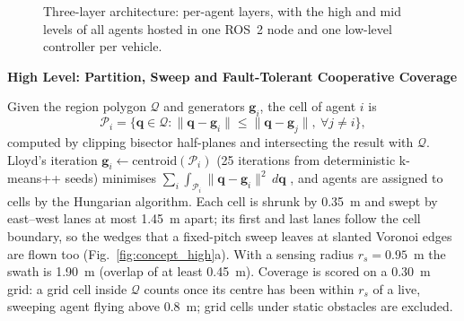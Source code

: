 \documentclass[10pt,letterpaper]{article}
\newif\ifafterheadone
\newcommand{\headingtwo}[1]{\par\ifafterheadone\nopagebreak\else\addpenalty{-200}\fi\vspace{6pt}%
    {\centering\fontsize{12}{14}\selectfont\bfseries #1\par}%
    \nopagebreak\vspace{2pt}\nopagebreak\global\afterheadonefalse\noindent\ignorespaces}
\begin{document}
\begin{figure}[!tb]
\caption{Three-layer architecture: per-agent layers, with the high and mid levels of all agents hosted in one ROS~2 node and one low-level controller per vehicle.}
\label{fig:arch}
\end{figure}

\headingtwo{High Level: Partition, Sweep and Fault-Tolerant Cooperative Coverage}
Given the region polygon $\mathcal{Q}$ and generators $\mathbf{g}_i$, the cell of agent $i$ is
\begin{equation}
    \mathcal{P}_i=\bigl\{\mathbf{q}\in\mathcal{Q}:\|\mathbf{q}-\mathbf{g}_i\|\le\|\mathbf{q}-\mathbf{g}_j\|,\ \forall j\ne i\bigr\},
    \label{eq:vor}
\end{equation}
computed by clipping bisector half-planes and intersecting the result with $\mathcal{Q}$. Lloyd's
iteration $\mathbf{g}_i\leftarrow\mathrm{centroid}(\mathcal{P}_i)$ (25 iterations from
deterministic k-means++ seeds) minimises
$\sum_i\int_{\mathcal{P}_i}\|\mathbf{q}-\mathbf{g}_i\|^2\,d\mathbf{q}$
\cite{lloydLeastSquaresQuantization1982}, and agents are assigned to cells by the Hungarian algorithm.
Each cell is shrunk by 0.35~m and swept by east--west lanes at most 1.45~m apart; its first and
last lanes follow the cell boundary, so the wedges that a fixed-pitch sweep leaves at slanted
Voronoi edges are flown too (Fig.~\ref{fig:concept_high}a). With a sensing radius $r_s=0.95$~m
the swath is 1.90~m (overlap of at least 0.45~m). Coverage is scored on a 0.30~m grid: a grid cell
inside $\mathcal{Q}$ counts once its centre has been within $r_s$ of a live, sweeping agent
flying above 0.8~m; grid cells under static obstacles are excluded.
\end{document}
